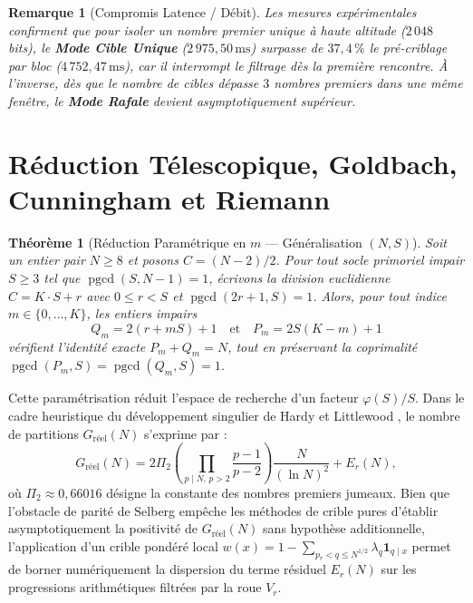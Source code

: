 \documentclass[11pt,a4paper]{article}
\DeclareMathOperator{\pgcd}{pgcd}
\newtheorem{theorem}{Théorème}
\newtheorem{remark}{Remarque}
\begin{document}
\begin{remark}[Compromis Latence / Débit]
Les mesures expérimentales confirment que pour isoler un nombre premier unique à haute altitude ($2\,048$ bits), le \textbf{Mode Cible Unique} ($2\,975{,}50\,\text{ms}$) surpasse de $37{,}4\,\%$ le pré-criblage par bloc ($4\,752{,}47\,\text{ms}$), car il interrompt le filtrage dès la première rencontre. À l'inverse, dès que le nombre de cibles dépasse $3$ nombres premiers dans une même fenêtre, le \textbf{Mode Rafale} devient asymptotiquement supérieur.
\end{remark}

\section{Réduction Télescopique, Goldbach, Cunningham et Riemann}

\begin{theorem}[Réduction Paramétrique en $m$ — Généralisation $(N, S)$]
Soit un entier pair $N \geq 8$ et posons $C = (N - 2)/2$. Pour tout socle primoriel impair $S \geq 3$ tel que $\pgcd(S, N - 1) = 1$, écrivons la division euclidienne $C = K \cdot S + r$ avec $0 \leq r < S$ et $\pgcd(2r + 1, S) = 1$. Alors, pour tout indice $m \in \{0, \dots, K\}$, les entiers impairs
\begin{equation}
Q_m = 2(r + mS) + 1 \quad \text{et} \quad P_m = 2S(K - m) + 1
\end{equation}
vérifient l'identité exacte $P_m + Q_m = N$, tout en préservant la coprimalité $\pgcd(P_m, S) = \pgcd(Q_m, S) = 1$.
\end{theorem}

Cette paramétrisation réduit l'espace de recherche d'un facteur $\varphi(S)/S$. Dans le cadre heuristique du développement singulier de Hardy et Littlewood \cite{hardy1923}, le nombre de partitions $G_{\text{réel}}(N)$ s'exprime par :
\begin{equation}
G_{\text{réel}}(N) = 2\Pi_2 \left(\prod_{p \mid N,\, p>2} \frac{p-1}{p-2}\right) \frac{N}{(\ln N)^2} + E_r(N),
\end{equation}
où $\Pi_2 \approx 0{,}66016$ désigne la constante des nombres premiers jumeaux. Bien que l'obstacle de parité de Selberg \cite{selberg1949} empêche les méthodes de crible pures d'établir asymptotiquement la positivité de $G_{\text{réel}}(N)$ sans hypothèse additionnelle, l'application d'un crible pondéré local $w(x) = 1 - \sum_{p_r < q \leq N^{1/2}} \lambda_q \mathbf{1}_{q \mid x}$ permet de borner numériquement la dispersion du terme résiduel $E_r(N)$ sur les progressions arithmétiques filtrées par la roue $V_r$.
\end{document}
